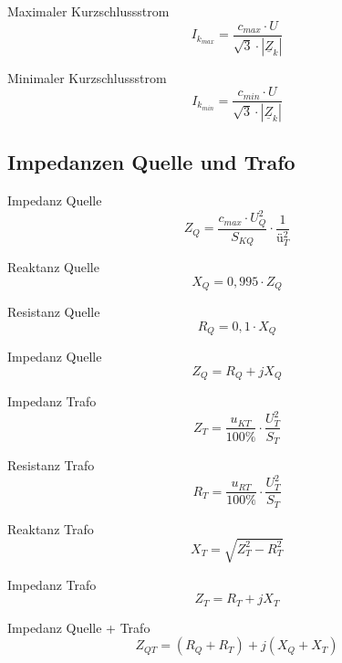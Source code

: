 \documentclass[11pt, a4paper, final, fleqn, twocolumn]{article}
\numberwithin{equation}{subsection}
\begin{document}
\noindent Maximaler Kurzschlussstrom
\begin{equation}
    I_{k_{max}} = \frac{c_{max} \cdot U}{\sqrt{3} \cdot |\underline{Z}_k|}
\end{equation}

\noindent Minimaler Kurzschlussstrom
\begin{equation}
    I_{k_{min}} = \frac{c_{min} \cdot U}{\sqrt{3} \cdot |\underline{Z}_k|}
\end{equation}


\subsection{Impedanzen Quelle und Trafo}

Impedanz Quelle
\begin{equation}
    Z_Q = \frac{c_{max} \cdot U_Q^2}{S_{KQ}} \cdot \frac{1}{\text{ü}_T^2}
\end{equation}

\noindent Reaktanz Quelle
\begin{equation}
    X_Q = 0,995 \cdot Z_Q
\end{equation}

\noindent Resistanz Quelle
\begin{equation}
    R_Q = 0,1 \cdot X_Q
\end{equation}

\noindent Impedanz Quelle
\begin{equation}
    Z_Q = R_Q + jX_Q
\end{equation}

\noindent Impedanz Trafo
\begin{equation}
    Z_T = \frac{u_{KT}}{100\%} \cdot \frac{U_T^2}{S_T}
\end{equation}

\noindent Resistanz Trafo
\begin{equation}
    R_T = \frac{u_{RT}}{100\%} \cdot \frac{U_T^2}{S_T}
\end{equation}

\noindent Reaktanz Trafo
\begin{equation}
    X_T = \sqrt{Z_T^2 - R_T^2}
\end{equation}

\noindent Impedanz Trafo
\begin{equation}
    Z_T = R_T + jX_T
\end{equation}

\noindent Impedanz Quelle + Trafo
\begin{equation}
    Z_{QT} = (R_Q + R_T) + j(X_Q + X_T)
\end{equation}
\end{document}
